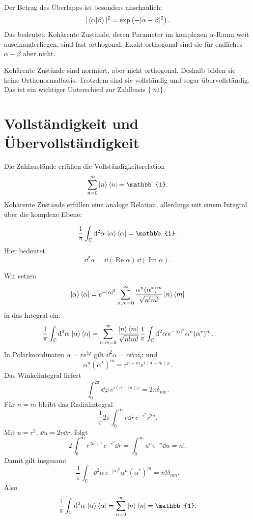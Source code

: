 Der Betrag des Überlapps ist besonders anschaulich:
\[
    |\left\langle\alpha\middle|\beta\right\rangle|^2
    =\exp\left(-|\alpha-\beta|^2\right).
\]
Das bedeutet: Kohärente Zustände, deren Parameter im komplexen \(\alpha\)-Raum weit auseinanderliegen, sind fast orthogonal. Exakt orthogonal sind sie für endliches \(\alpha-\beta\) aber nicht.

\begin{warningbox}
Kohärente Zustände sind normiert, aber nicht orthogonal. Deshalb bilden sie keine Orthonormalbasis. Trotzdem sind sie vollständig und sogar übervollständig. Das ist ein wichtiger Unterschied zur Zahlbasis \(\{\left|n\right\rangle\}\).
\end{warningbox}

\section{Vollständigkeit und Übervollständigkeit}

Die Zahlzustände erfüllen die Vollständigkeitsrelation
\[
    \sum_{n=0}^{\infty}\ket{n}\bra{n}=\mathbb{1}.
\]
Kohärente Zustände erfüllen eine analoge Relation, allerdings mit einem Integral über die komplexe Ebene:
\begin{formulabox}
\[
    \frac{1}{\pi}\int_{\mathbb{C}}\dd^2\alpha\,\ket{\alpha}\bra{\alpha}=\mathbb{1}.
\]
Hier bedeutet
\[
    \dd^2\alpha=\dd(\operatorname{Re}\alpha)\,\dd(\operatorname{Im}\alpha).
\]
\end{formulabox}

\begin{derivationbox}
Wir setzen
\[
    \left|\alpha\right\rangle\left\langle\alpha\right|
    =e^{-|\alpha|^2}\sum_{n,m=0}^{\infty}
    \frac{\alpha^n(\alpha^*)^m}{\sqrt{n!m!}}\left|n\right\rangle\left\langle m\right|
\]
in das Integral ein:
\[
    \frac{1}{\pi}\int_{\mathbb{C}}\mathrm{d}^2\alpha\,\left|\alpha\right\rangle\left\langle\alpha\right|
    =\sum_{n,m=0}^{\infty}\frac{\left|n\right\rangle\left\langle m\right|}{\sqrt{n!m!}}
    \frac{1}{\pi}\int_{\mathbb{C}}\mathrm{d}^2\alpha\,e^{-|\alpha|^2}\alpha^n(\alpha^*)^m.
\]
In Polarkoordinaten \(\alpha=re^{i\varphi}\) gilt \(\dd^2\alpha=r\dd r\dd\varphi\) und
\[
    \alpha^n(\alpha^*)^m=r^{n+m}e^{i(n-m)\varphi}.
\]
Das Winkelintegral liefert
\[
    \int_0^{2\pi}\dd\varphi\,e^{i(n-m)\varphi}=2\pi\delta_{nm}.
\]
Für \(n=m\) bleibt das Radialintegral
\[
    \frac{1}{\pi}2\pi\int_0^\infty r\dd r\,e^{-r^2}r^{2n}.
\]
Mit \(u=r^2\), \(\dd u=2r\dd r\), folgt
\[
    2\int_0^\infty r^{2n+1}e^{-r^2}\dd r
    =\int_0^\infty u^n e^{-u}\dd u=n!.
\]
Damit gilt insgesamt
\[
    \frac{1}{\pi}\int_{\mathbb{C}}\dd^2\alpha\,e^{-|\alpha|^2}\alpha^n(\alpha^*)^m
    =n!\delta_{nm}.
\]
Also
\[
    \frac{1}{\pi}\int_{\mathbb{C}}\dd^2\alpha\,\ket{\alpha}\bra{\alpha}
    =\sum_{n=0}^{\infty}\ket{n}\bra{n}=\mathbb{1}.
\]
\end{derivationbox}

